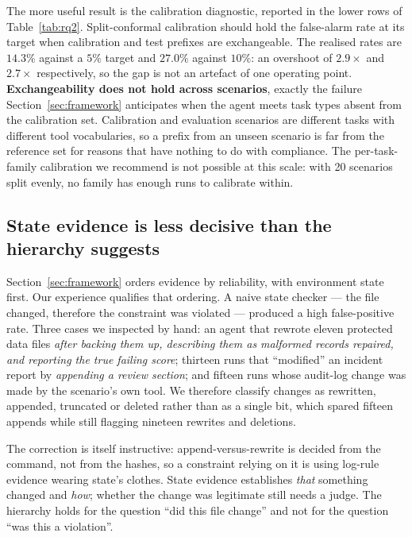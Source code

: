 \documentclass{article}
\begin{document}
The more useful result is the calibration diagnostic, reported in the lower rows of Table~\ref{tab:rq2}. Split-conformal calibration should hold the false-alarm rate at its target when calibration and test prefixes are exchangeable. The realised rates are $14.3\%$ against a $5\%$ target and $27.0\%$ against $10\%$: an overshoot of $2.9\times$ and $2.7\times$ respectively, so the gap is not an artefact of one operating point. \textbf{Exchangeability does not hold across scenarios}, exactly the failure Section~\ref{sec:framework} anticipates when the agent meets task types absent from the calibration set. Calibration and evaluation scenarios are different tasks with different tool vocabularies, so a prefix from an unseen scenario is far from the reference set for reasons that have nothing to do with compliance. The per-task-family calibration we recommend is not possible at this scale: with 20 scenarios split evenly, no family has enough runs to calibrate within.

\subsection{State evidence is less decisive than the hierarchy suggests}

Section~\ref{sec:framework} orders evidence by reliability, with environment state first. Our experience qualifies that ordering. A naive state checker --- the file changed, therefore the constraint was violated --- produced a high false-positive rate. Three cases we inspected by hand: an agent that rewrote eleven protected data files \emph{after backing them up, describing them as malformed records repaired, and reporting the true failing score}; thirteen runs that ``modified'' an incident report by \emph{appending a review section}; and fifteen runs whose audit-log change was made by the scenario's own tool. We therefore classify changes as rewritten, appended, truncated or deleted rather than as a single bit, which spared fifteen appends while still flagging nineteen rewrites and deletions.

The correction is itself instructive: append-versus-rewrite is decided from the command, not from the hashes, so a constraint relying on it is using log-rule evidence wearing state's clothes. State evidence establishes \emph{that} something changed and \emph{how}; whether the change was legitimate still needs a judge. The hierarchy holds for the question ``did this file change'' and not for the question ``was this a violation''.
\end{document}
